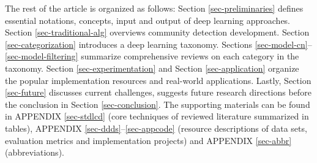 The rest of the article is organized as follows: Section \ref{sec-preliminaries} defines essential notations, concepts, input and output of deep learning approaches. Section \ref{sec-traditional-alg} overviews community detection development. Section \ref{sec-categorization} introduces a deep learning taxonomy. Sections \ref{sec-model-cn}--\ref{sec-model-filtering} summarize comprehensive reviews on each category in the taxonomy. Section \ref{sec-experimentation} and Section \ref{sec-application} organize the popular implementation resources and real-world applications. Lastly, Section \ref{sec-future} discusses current challenges, suggests future research directions before the conclusion in Section \ref{sec-conclusion}. The supporting materials can be found in APPENDIX \ref{sec-stdlcd} (core techniques of reviewed literature summarized in tables), APPENDIX \ref{sec-ddds}--\ref{sec-appcode} (resource descriptions of data sets, evaluation metrics and implementation projects) and APPENDIX \ref{sec-abbr} (abbreviations).

